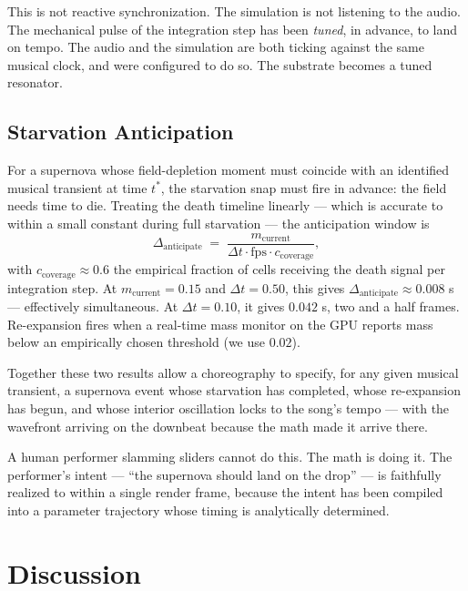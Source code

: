 \documentclass[11pt]{article}
\begin{document}
This is not reactive synchronization. The simulation is not listening to
the audio. The mechanical pulse of the integration step has been
\emph{tuned}, in advance, to land on tempo. The audio and the simulation
are both ticking against the same musical clock, and were configured to
do so. The substrate becomes a tuned resonator.

\subsection{Starvation Anticipation}

For a supernova whose field-depletion moment must coincide with an
identified musical transient at time $t^*$, the starvation snap must fire
in advance: the field needs time to die. Treating the death timeline
linearly --- which is accurate to within a small constant during full
starvation --- the anticipation window is
\begin{equation}
  \Delta_{\text{anticipate}} \;=\; \frac{m_{\text{current}}}{\Delta t \cdot \mathrm{fps} \cdot c_{\text{coverage}}},
\end{equation}
with $c_{\text{coverage}} \approx 0.6$ the empirical fraction of cells
receiving the death signal per integration step. At
$m_{\text{current}} = 0.15$ and $\Delta t = 0.50$, this gives
$\Delta_{\text{anticipate}} \approx 0.008$ s --- effectively
simultaneous. At $\Delta t = 0.10$, it gives $0.042$ s, two and a half
frames. Re-expansion fires when a real-time mass monitor on the GPU
reports mass below an empirically chosen threshold (we use $0.02$).

Together these two results allow a choreography to specify, for any
given musical transient, a supernova event whose starvation has completed,
whose re-expansion has begun, and whose interior oscillation locks to the
song's tempo --- with the wavefront arriving on the downbeat because
the math made it arrive there.

A human performer slamming sliders cannot do this. The math is doing
it. The performer's intent --- ``the supernova should land on the drop''
--- is faithfully realized to within a single render frame, because the
intent has been compiled into a parameter trajectory whose timing is
analytically determined.

\section{Discussion}
\end{document}
